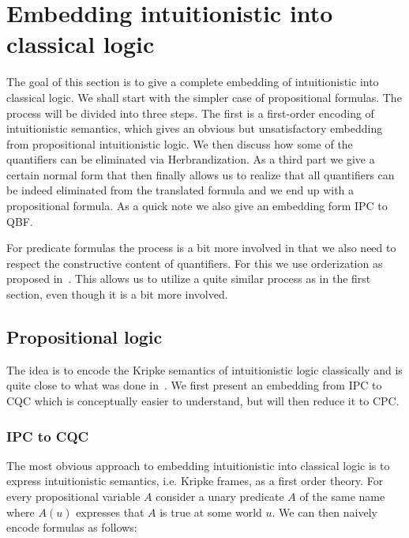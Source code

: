 \documentclass[a4paper,12pt]{report}
\theoremstyle{definition}
\theoremstyle{definition}
\theoremstyle{definition}
\theoremstyle{definition}
\theoremstyle{definition}
\theoremstyle{definition}
\theoremstyle{definition}
\begin{document}
	\chapter{Embedding intuitionistic into classical logic}
	
	The goal of this section is to give a complete embedding of intuitionistic into classical logic. We shall start with the simpler case of propositional formulas. The process will be divided into three steps. The first is a first-order encoding of intuitionistic semantics, which gives an obvious but unsatisfactory embedding from propositional intuitionistic logic. We then discuss how some of the quantifiers can be eliminated via Herbrandization. As a third part we give a certain normal form that then finally allows us to realize that all quantifiers can be indeed eliminated from the translated formula and we end up with a propositional formula. As a quick note we also give an embedding form IPC to QBF.
	
	For predicate formulas the process is a bit more involved in that we also need to respect the constructive content of quantifiers. For this we use orderization as proposed in~\cite{iemhoff2010eskolemization}. This allows us to utilize a quite similar process as in the first section, even though it is a bit more involved.
	
	\section{Propositional logic}
	
	The idea is to encode the Kripke semantics of intuitionistic logic classically and is quite close to what was done in~\cite{iemhoff2010eskolemization}. We first present an embedding from IPC to CQC which is conceptually easier to understand, but will then reduce it to CPC.
	
	\subsection{IPC to CQC}
	
	The most obvious approach to embedding intuitionistic into classical logic is to express intuitionistic semantics, i.e. Kripke frames, as a first order theory. For every propositional variable $A$ consider a unary predicate $A$ of the same name where $A(u)$ expresses that $A$ is true at some world $u$. We can then naively encode formulas as follows:
	
\end{document}
